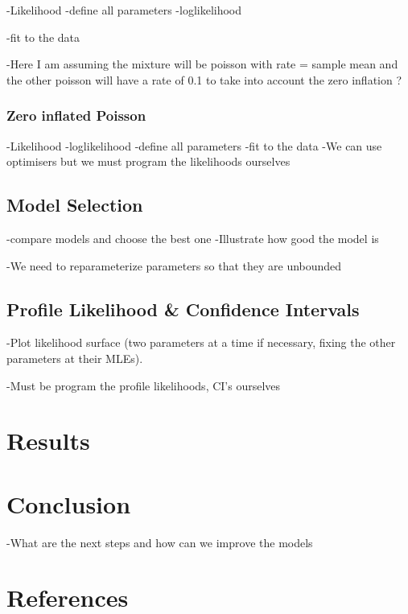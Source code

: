 \documentclass[11pt,preprint, authoryear]{elsarticle}
\numberwithin{equation}{section}
\numberwithin{figure}{section}
\numberwithin{table}{section}
\begin{document}
-Likelihood -define all parameters -loglikelihood

-fit to the data

-Here I am assuming the mixture will be poisson with rate = sample mean
and the other poisson will have a rate of 0.1 to take into account the
zero inflation ?

\subsubsection{Zero inflated Poisson}\label{zero-inflated-poisson}

-Likelihood -loglikelihood -define all parameters -fit to the data -We
can use optimisers but we must program the likelihoods ourselves

\subsection{Model Selection}\label{model-selection}

-compare models and choose the best one -Illustrate how good the model
is

-We need to reparameterize parameters so that they are unbounded

\subsection{Profile Likelihood \& Confidence
Intervals}\label{profile-likelihood-confidence-intervals}

-Plot likelihood surface (two parameters at a time if necessary, fixing
the other parameters at their MLEs).

-Must be program the profile likelihoods, CI's ourselves

\section{Results}\label{results}

\section{Conclusion}\label{conclusion}

-What are the next steps and how can we improve the models

\section{References}\label{references}

\newpage
\nocite{*}

\end{document}
